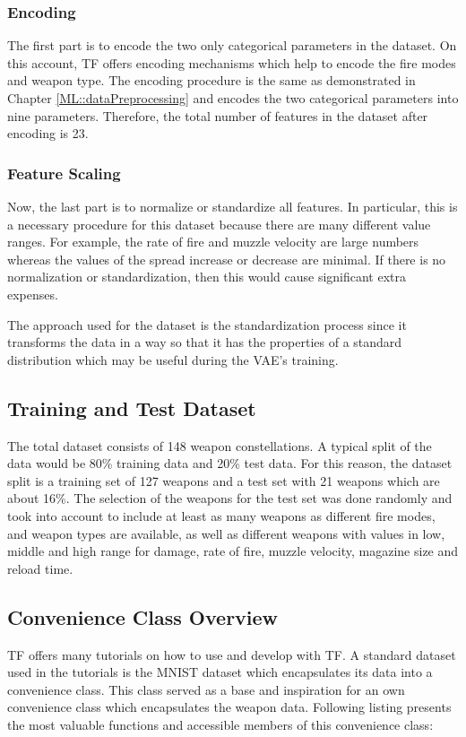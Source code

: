 \documentclass[MGS,Master,english]{twbook}%
\begin{document}
\subsubsection{Encoding}
The first part is to encode the two only categorical parameters in the dataset. On this account, TF offers encoding mechanisms which help to encode the fire modes and weapon type. The encoding procedure is the same as demonstrated in Chapter \ref{ML::dataPreprocessing} and encodes the two categorical parameters into nine parameters. Therefore, the total number of features in the dataset after encoding is 23.

\subsubsection{Feature Scaling}
Now, the last part is to normalize or standardize all features. In particular, this is a necessary procedure for this dataset because there are many different value ranges. For example, the rate of fire and muzzle velocity are large numbers whereas the values of the spread increase or decrease are minimal. If there is no normalization or standardization, then this would cause significant extra expenses.

The approach used for the dataset is the standardization process since it transforms the data in a way so that it has the properties of a standard distribution which may be useful during the VAE's training. 

\subsection{Training and Test Dataset}
The total dataset consists of 148 weapon constellations. A typical split of the data would be 80\% training data and 20\% test data. For this reason, the dataset split is a training set of 127 weapons and a test set with 21 weapons which are about 16\%. The selection of the weapons for the test set was done randomly and took into account to include at least as many weapons as different fire modes, and weapon types are available, as well as different weapons with values in low, middle and high range for damage, rate of fire, muzzle velocity, magazine size and reload time.

\subsection{Convenience Class Overview}
TF offers many tutorials on how to use and develop with TF. A standard dataset used in the tutorials is the MNIST dataset which encapsulates its data into a convenience class. This class served as a base and inspiration for an own convenience class which encapsulates the weapon data. Following listing presents the most valuable functions and accessible members of this convenience class:
\end{document}
